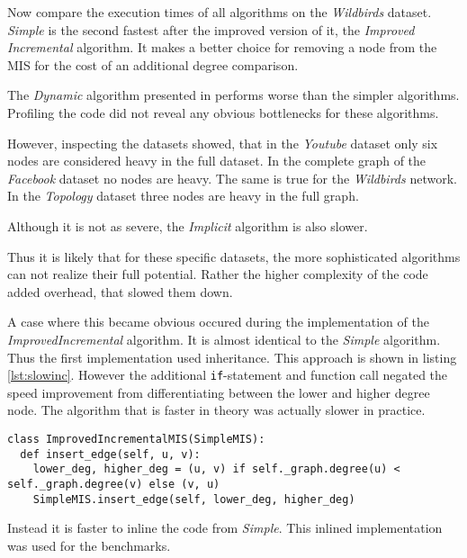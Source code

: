 \documentclass[letterpaper,12pt]{article}
\begin{document}
Now compare the execution times of all algorithms on the \textit{Wildbirds}
dataset. \textit{Simple} is the second fastest after the improved version of it,
the \textit{Improved Incremental} algorithm. It makes a better choice for removing
a node from the MIS for the cost of an additional degree comparison.

The \textit{Dynamic} algorithm presented in \cite{gupta2018simple} performs
worse than the simpler algorithms. Profiling the code did not reveal
any obvious bottlenecks for these algorithms.

However, inspecting the datasets showed, that in the \textit{Youtube} dataset
only six nodes are considered heavy in the full dataset. In the complete graph
of the \textit{Facebook} dataset no nodes are heavy. The same is true for the
\textit{Wildbirds} network. In the \textit{Topology} dataset three nodes are
heavy in the full graph.

Although it is not as severe, the \textit{Implicit} algorithm is also slower.


Thus it is likely that for these specific datasets, the more sophisticated
algorithms can not realize their full potential.
Rather the higher complexity of the code added overhead, that slowed them down.


A case where this became obvious occured during the implementation of the
\textit{ImprovedIncremental} algorithm. It is almost identical to the
\textit{Simple} algorithm. Thus the first implementation used inheritance. This
approach is shown in listing \ref{lst:slowinc}. However the additional
\lstinline[]{if}-statement and function call negated the speed improvement from
differentiating between the lower and higher degree node. The algorithm that is
faster in theory was actually slower in practice.


\begin{lstlisting}[label={lst:slowinc}, caption={Slow implementation}]
class ImprovedIncrementalMIS(SimpleMIS):
  def insert_edge(self, u, v):
    lower_deg, higher_deg = (u, v) if self._graph.degree(u) < self._graph.degree(v) else (v, u)
    SimpleMIS.insert_edge(self, lower_deg, higher_deg)
\end{lstlisting}

Instead it is faster to inline the code from \textit{Simple}. This inlined implementation
was used for the benchmarks.
\end{document}
